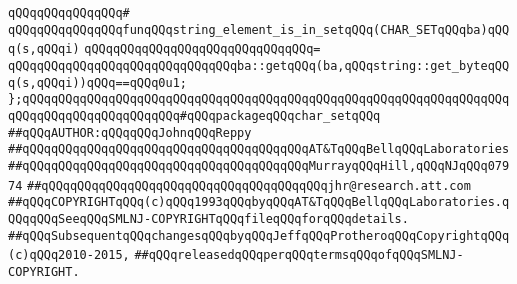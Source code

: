 \verb|qQQqqQQqqQQqqQQq#|\newline
\verb|qQQqqQQqqQQqqQQqfunqQQqstring_element_is_in_setqQQq(CHAR_SETqQQqba)qQQq(s,qQQqi)|\newline
\verb|qQQqqQQqqQQqqQQqqQQqqQQqqQQqqQQq=|\newline
\verb|qQQqqQQqqQQqqQQqqQQqqQQqqQQqqQQqba::getqQQq(ba,qQQqstring::get_byteqQQq(s,qQQqi))qQQq==qQQq0u1;|\newline
\newline
\verb|};qQQqqQQqqQQqqQQqqQQqqQQqqQQqqQQqqQQqqQQqqQQqqQQqqQQqqQQqqQQqqQQqqQQqqQQqqQQqqQQqqQQqqQQqqQQq#qQQqpackageqQQqchar_setqQQq|\newline
\newline
\newline
\verb|##qQQqAUTHOR:qQQqqQQqJohnqQQqReppy|\newline
\verb|##qQQqqQQqqQQqqQQqqQQqqQQqqQQqqQQqqQQqqQQqAT&TqQQqBellqQQqLaboratories|\newline
\verb|##qQQqqQQqqQQqqQQqqQQqqQQqqQQqqQQqqQQqqQQqMurrayqQQqHill,qQQqNJqQQq07974|\newline
\verb|##qQQqqQQqqQQqqQQqqQQqqQQqqQQqqQQqqQQqqQQqjhr@research.att.com|\newline
\newline
\verb|##qQQqCOPYRIGHTqQQq(c)qQQq1993qQQqbyqQQqAT&TqQQqBellqQQqLaboratories.qQQqqQQqSeeqQQqSMLNJ-COPYRIGHTqQQqfileqQQqforqQQqdetails.|\newline
\verb|##qQQqSubsequentqQQqchangesqQQqbyqQQqJeffqQQqProtheroqQQqCopyrightqQQq(c)qQQq2010-2015,|\newline
\verb|##qQQqreleasedqQQqperqQQqtermsqQQqofqQQqSMLNJ-COPYRIGHT.|\newline

